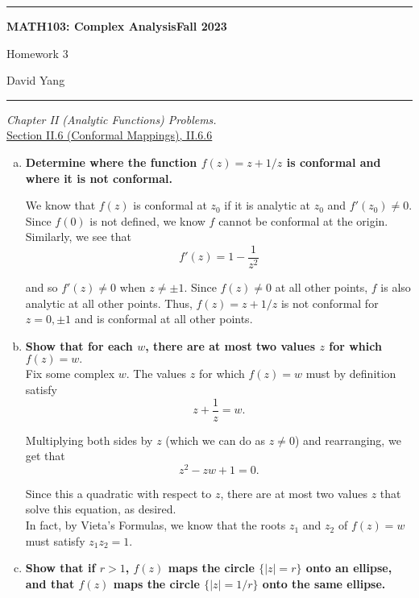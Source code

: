 \documentclass[11pt]{article}
\theoremstyle{definition}
\begin{document}
	\hrule
	\begin{center}
        \textbf{MATH103: Complex Analysis}\hfill \textbf{Fall 2023}\newline

		{\Large Homework 3}

		David Yang
	\end{center}

\hrule

\vspace{1em}


\textit{Chapter II (Analytic Functions) Problems.} \\

\underline{Section II.6 (Conformal Mappings), II.6.6}

\begin{enumerate}[a)]
    \item \textbf{Determine where the function $f(z) = z + 1/z$ is conformal and where it is not conformal.}
    
    We know that $f(z)$ is conformal at $z_0$ if it is analytic at $z_0$ and $f'(z_0) \neq 0.$ Since $f(0)$ is not defined, we know $f$ cannot be conformal at the origin. Similarly, we see that
    \[ f'(z) = 1 - \frac{1}{z^2} \]

    and so $f'(z) \neq 0$ when $z \neq \pm 1.$ Since $f(z) \neq 0$ at all other points, $f$ is also analytic at all other points. Thus, $f(z) = z + 1/z$ is not conformal for $z = 0, \pm 1$ and is conformal at all other points. \\

    \item \textbf{Show that for each $w$, there are at most two values $z$ for which $f(z) = w.$} \\
    
    Fix some complex $w$. The values $z$ for which $f(z) = w$ must by definition satisfy
    \[ z + \frac{1}{z} = w.\]

    Multiplying both sides by $z$ (which we can do as $z \neq 0$) and rearranging, we get that
    \[ z^2 - zw + 1 = 0. \]

    Since this a quadratic with respect to $z$, there are at most two values $z$ that solve this equation, as desired. \\

    In fact, by Vieta's Formulas, we know that the roots $z_1$ and $z_2$ of $f(z) = w$ must satisfy $z_1z_2 = 1$. \\

    \item \textbf{Show that if $r > 1$, $f(z)$ maps the circle $\{|z| = r\}$ onto an ellipse, and that $f(z)$ maps the circle $\{|z| = 1/r\}$ onto the same ellipse. } \\
    

\end{enumerate}
\end{document}
